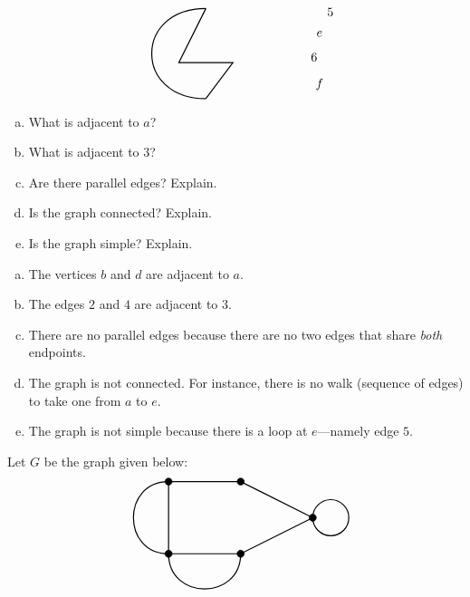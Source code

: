 \documentclass[12pt,letterpaper]{exam}
\begin{document}
\begin{questions}
\[\begin{tikzpicture}
	\node at (4.2,1.4) {$5$};	
	\node at (3.9,0.8) {$e$};
	\node at (3.75,0.15) {$6$};
	\node at (3.9,-0.6) {$f$};	
	
	\draw[line width=0.03cm] (0.75,1.5) to[bend right=90, distance=2cm] (0.75,-1); %
	\draw[line width=0.03cm] (0.75,-1) -- (1.5,0) -- (0,0) -- (0.75,1.5); %
	\end{tikzpicture}
	\]

\begin{enumerate}[(a)]
\item What is adjacent to $a$?
\item What is adjacent to 3?
\item Are there parallel edges? Explain.
\item Is the graph connected? Explain.
\item Is the graph simple? Explain. 
\end{enumerate} \pspace

\sol 
\begin{enumerate}[(a)]
\item The vertices $b$ and $d$ are adjacent to $a$. \pspace

\item The edges $2$ and $4$ are adjacent to $3$. \pspace

\item There are no parallel edges because there are no two edges that share \textit{both} endpoints. \pspace

\item The graph is not connected. For instance, there is no walk (sequence of edges) to take one from $a$ to $e$. \pspace

\item The graph is not simple because there is a loop at $e$---namely edge $5$. 
\end{enumerate}



\newpage
\question[10]  Let $G$ be the graph given below:
	\[
	\begin{tikzpicture}
	\draw[line width=0.03cm] (4,1) -- (2,0) -- (0,0) -- (0,2) -- (2,2) -- (4,1);
	\draw[line width=0.03cm] (0,0) to[bend left=90, distance=1.3cm] (0,2);
	\draw[line width=0.03cm] (0,0) to[bend right=90, distance=1.3cm] (2,0);
	\draw[line width=0.03cm] (4.5,1) circle (0.5);
	
	\draw[fill=black] (0,0) circle (0.1);
	\draw[fill=black] (0,2) circle (0.1);
	\draw[fill=black] (2,2) circle (0.1);
	\draw[fill=black] (2,0) circle (0.1);
	\draw[fill=black] (4,1) circle (0.1);
	

\end{tikzpicture}\]
\end{questions}
\end{document}
